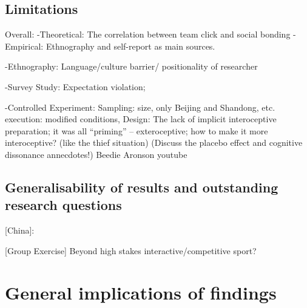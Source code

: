 \subsection{Limitations}
Overall:
-Theoretical:
    The correlation between team click and social bonding
-Empirical:
  Ethnography and self-report as main sources.  

-Ethnography:
    Language/culture barrier/ positionality of researcher


-Survey Study:
    Expectation violation;


-Controlled Experiment:
    Sampling: size, only Beijing and Shandong, etc.
    execution: modified conditions,
    Design: The lack of implicit interoceptive preparation; it was all ``priming'' -- exteroceptive; how to make it more interoceptive? (like the thief situation)
    (Discuss the placebo effect and cognitive dissonance annecdotes!)
    Beedie
    Aronson youtube








\subsection{Generalisability of results and outstanding research questions}
[China]:



[Group Exercise]
  Beyond high stakes interactive/competitive sport?






\section{General implications of findings}






